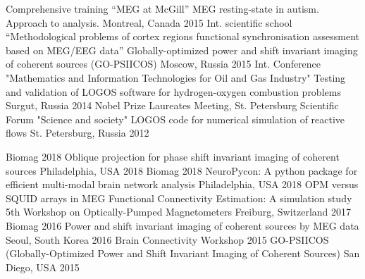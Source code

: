 \begin{cventries}
  \cventry
    {Comprehensive training ``MEG at McGill''}
    {MEG resting-state in autism. Approach to analysis.}
    {Montreal, Canada}
    {2015}
    {
    }
  \cventry
    {Int. scientific school ``Methodological problems of cortex regions functional synchronisation assessment based on MEG/EEG data''}
  {Globally-optimized power and shift invariant imaging of coherent sources (GO-PSIICOS)}
    {Moscow, Russia}
    {2015}
    {}
  \cventry
    {Int. Conference "Mathematics and Information Technologies for Oil and Gas Industry"}
    {Testing and validation of LOGOS software for hydrogen-oxygen combustion problems}
    {Surgut, Russia}
    {2014}
    {}
  \cventry
    {Nobel Prize Laureates Meeting, St. Petersburg Scientific Forum "Science and society"}
    {LOGOS code for numerical simulation of reactive flows}
    {St. Petersburg, Russia}
    {2012}
    {
    }
\end{cventries}
\begin{cventries}
    \cventry
    {Biomag 2018}
    {Oblique projection for phase shift invariant imaging of coherent sources}
    {Philadelphia, USA}
    {2018}
    {}
    \cventry
    {Biomag 2018}
    {NeuroPycon: A python package for efficient multi-modal brain network analysis}
    {Philadelphia, USA}
    {2018}
    {
    }
    \cventry
    {OPM versus SQUID arrays in MEG Functional Connectivity Estimation: A simulation study}
    {5th Workshop on Optically-Pumped Magnetometers}
    {Freiburg, Switzerland}
    {2017}
    {}
    \cventry
    {Biomag 2016}
    {Power and shift invariant imaging of coherent sources by MEG data}
    {Seoul, South Korea}
    {2016}
    {}
    \cventry
    {Brain Connectivity Workshop 2015}
    {GO-PSIICOS (Globally-Optimized Power and Shift Invariant Imaging of Coherent Sources)}
    {San Diego, USA}
    {2015}
    {}
\end{cventries}
